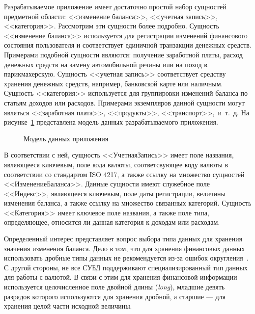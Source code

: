 Разрабатываемое приложение имеет достаточно простой набор сущностей
предметной области: <<изменение баланса>>, <<учетная запись>>, <<категория>>.
Рассмотрим эти сущности более подробно.
Сущность <<изменение баланса>> используется для регистрации изменений
финансового состояния пользователя и соответствует единичной транзакции
денежных средств.
Примерами подобной сущности являются: получение заработной платы,
расход денежных средств на замену автомобильной резины или на поход в
парикмахерскую.
Сущность <<учетная запись>> соответствует средству хранения денежных
средств, например, банковской карте или наличным.
Сущность <<категория>> используется для группировки изменений баланса
по статьям доходов или расходов. Примерами экземпляров данной сущности
могут являться <<заработная плата>>, <<продукты>>, <<транспорт>>,~и~т.~д.
На рисунке~\ref{fig:design_entities} представлена модель данных
разрабатываемого приложения.

\begin{figure}[h!]
  \centering
  \caption{Модель данных приложения}
  \label{fig:design_entities}
\end{figure}

В соответствии с ней, сущность <<УчетнаяЗапись>> имеет поле названия,
являющееся ключевым, поле кода валюты, соответсвующее коду валюты
в соответствии со стандартом ISO 4217, а также ссылку на множество сущностей
<<ИзменениеБаланса>>. Данные сущности имеют служебное поле <<Индекс>>,
являющееся ключевым, поле даты регистрации, величины изменения баланса,
а также ссылку на множество связанных категорий.
Сущность <<Категория>> имеет ключевое поле названия, а также поле типа,
определяющее, относится ли данная категория к доходам или расходам.

Определенный интерес представляет вопрос выбора типа данных для хранения
значения изменения баланса. Дело в том, что для хранения финансовых данных
использовать дробные типы данных не рекомендуется
из-за ошибок округления~\cite{bloch08}. С другой стороны, не все СУБД
поддерживают специализированный тип данных для работы с валютой.
В связи с этим для хранения финансовой информации используется целочисленное
поле двойной длины (\textit{long}), младшие девять разрядов которого используются
для хранения дробной, а старшие --- для хранения целой части
исходной величины.

